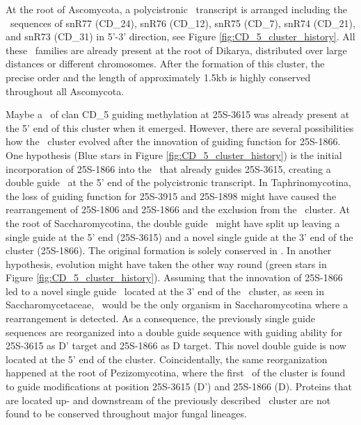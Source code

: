 At the root of Ascomycota, a polycistronic \sno\ transcript is
arranged including the \sno\ sequences of snR77 (CD\_24), snR76
(CD\_12), snR75 (CD\_7), snR74 (CD\_21), and snR73 (CD\_31) in 5'-3'
direction, see Figure \ref{fig:CD_5_cluster_history}.  All these \sno\
families are already present at the root of Dikarya, distributed over
large distances or different chromosomes. After the formation of this
cluster, the precise order and the length of approximately 1.5kb is
highly conserved throughout all Ascomycota.

Maybe a \sno\ of clan CD\_5 guiding methylation at 25S-3615 was
already present at the 5' end of this cluster when it
emerged. However, there are several possibilities how the \sno\
cluster evolved after the innovation of guiding function for 25S-1866.
One hypothesis (Blue stars in Figure \ref{fig:CD_5_cluster_history})
is the initial incorporation of 25S-1866 into the \sno\ that already
guides 25S-3615, creating a double guide \sno\ at the 5' end of the
polycistronic transcript. In Taphrinomycotina, the loss of guiding
function for 25S-3915 and 25S-1898 might have caused the rearrangement
of 25S-1806 and 25S-1866 and the exclusion from the \sno\
cluster. At the root of Saccharomycotina, the double guide \sno\ might
have split up leaving a single guide at the 5' end (25S-3615) and a
novel single guide at the 3' end of the cluster (25S-1866). The
original formation is solely conserved in \Yli. In another hypothesis,
evolution might have taken the other way round (green stars in Figure
\ref{fig:CD_5_cluster_history}). Assuming that the innovation of
25S-1866 led to a novel single guide \sno\ located at the 3' end of
the \sno\ cluster, as seen in Saccharomycetaceae, \yli\ would be the
only organism in Saccharomycotina where a rearrangement is
detected. As a consequence, the previously single guide sequences are
reorganized into a double guide sequence with guiding ability for
25S-3615 as D' target and 25S-1866 as D target. This novel double
guide is now located at the 5' end of the cluster.  Coincidentally,
the same reorganization happened at the root of Pezizomycotina, where
the first \sno\ of the cluster is found to guide modifications at
position 25S-3615 (D') and 25S-1866 (D). Proteins that are located up-
and downstream of the previously described \sno\ cluster are not found
to be conserved throughout major fungal lineages.

